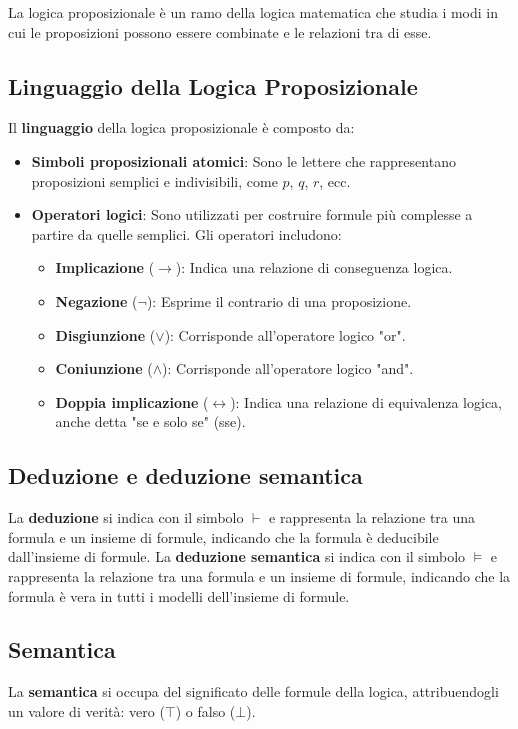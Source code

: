 \documentclass{article}
\begin{document}
La logica proposizionale è un ramo della logica matematica che studia i modi in cui le proposizioni possono essere combinate e le relazioni tra di esse.

\subsection{Linguaggio della Logica Proposizionale}
Il \textbf{linguaggio} della logica proposizionale è composto da:
\begin{itemize}
\item \textbf{Simboli proposizionali atomici}: Sono le lettere che rappresentano proposizioni semplici e indivisibili, come $p$, $q$, $r$, ecc.
\item \textbf{Operatori logici}: Sono utilizzati per costruire formule più complesse a partire da quelle semplici. Gli operatori includono:
\begin{itemize}
\item \textbf{Implicazione} ($\to$): Indica una relazione di conseguenza logica.
\item \textbf{Negazione} ($\neg$): Esprime il contrario di una proposizione.
\item \textbf{Disgiunzione} ($\lor$): Corrisponde all'operatore logico "or".
\item \textbf{Coniunzione} ($\land$): Corrisponde all'operatore logico "and".
\item \textbf{Doppia implicazione} ($\leftrightarrow$): Indica una relazione di equivalenza logica, anche detta "se e solo se" (sse).
\end{itemize}
\end{itemize}

\subsection{Deduzione e deduzione semantica}
La \textbf{deduzione} si indica con il simbolo $\vdash$ e rappresenta la relazione tra una formula e un insieme di formule, indicando che la formula è deducibile dall'insieme di formule.
La \textbf{deduzione semantica} si indica con il simbolo $\models$ e rappresenta la relazione tra una formula e un insieme di formule, indicando che la formula è vera in tutti i modelli dell'insieme di formule.

\subsection{Semantica}
La \textbf{semantica} si occupa del significato delle formule della logica, attribuendogli un valore di verità: vero ($\top$) o falso ($\bot$).
\end{document}
